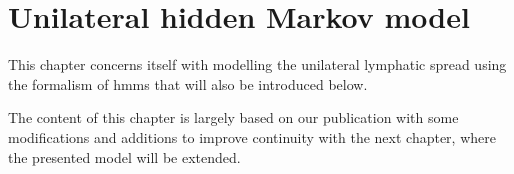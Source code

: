\documentclass[\relativeRoot/main.tex]{subfiles}
\begin{document}
\chapter{Unilateral hidden Markov model}
\label{chap:unilateral}

This chapter concerns itself with modelling the unilateral lymphatic spread using the formalism of \glspl{hmm} that will also be introduced below.

The content of this chapter is largely based on our publication \cite{ludwig_hidden_2021} with some modifications and additions to improve continuity with the next chapter, where the presented model will be extended.











\end{document}
